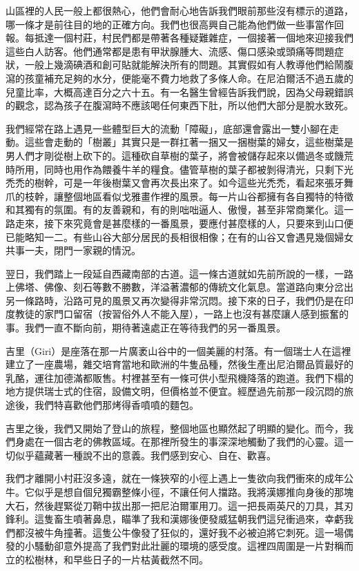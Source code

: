 山區裡的人民一般上都很熱心，他們會耐心地告訴我們眼前那些沒有標示的道路，哪一條才是前往目的地的正確方向。我們也很高興自己能為他們做一些事當作回報。每抵達一個村莊，村民們都是帶著各種疑難雜症，一個接著一個地來迎接我們這些白人訪客。他們通常都是患有甲狀腺腫大、流感、傷口感染或頭痛等問題症狀，一般上幾滴碘酒和創可貼就能解決所有的問題。其實假如有人教導他們給鬧腹瀉的孩童補充足夠的水分，便能毫不費力地救了多條人命。在尼泊爾活不過五歲的兒童比率，大概高達百分之六十五。有一名醫生曾經告訴我們說，因為父母親錯誤的觀念，認為孩子在腹瀉時不應該喝任何東西下肚，所以他們大部分是脫水致死。

我們經常在路上遇見一些體型巨大的流動「障礙」，底部還會露出一雙小腳在走動。這些會走動的「樹叢」其實只是一群扛著一捆又一捆樹葉的婦女，這些樹葉是男人們才剛從樹上砍下的。這種砍自草樹的葉子，將會被儲存起來以備過冬或饑荒時所用，同時也用作為餵養牛羊的糧食。儘管草樹的葉子都被剝得清光，只剩下光禿禿的樹幹，可是一年後樹葉又會再次長出來了。如今這些光禿禿，看起來張牙舞爪的枝幹，讓整個地區看似戈雅畫作裡的風景。每一片山谷都擁有各自獨特的特徵和其獨有的氛圍。有的友善親和，有的則咄咄逼人、傲慢，甚至非常商業化。這一路走來，接下來究竟會是甚麼樣的一番風景，要應付甚麼樣的人，只要來到山口便已能略知一二。有些山谷大部分居民的長相很相像；在有的山谷又會遇見幾個婦女共事一夫，閉門一家親的情況。

翌日，我們踏上一段延自西藏南部的古道。這一條古道就如先前所說的一樣，一路上佛塔、佛像、刻石等數不勝數，洋溢著濃郁的傳統文化氣息。當道路向東分岔出另一條路時，沿路可見的風景又再次變得非常沉悶。接下來的日子，我們仍是在印度教徒的家門口留宿（按習俗外人不能入屋），一路上也沒有甚麼讓人感到振奮的事。我們一直不斷向前，期待著遠處正在等待我們的另一番風景。

吉里（Giri）是座落在那一片廣袤山谷中的一個美麗的村落。有一個瑞士人在這裡建立了一座農場，雜交培育當地和歐洲的牛隻品種，然後生產出尼泊爾品質最好的乳酪，運往加德滿都販售。村裡甚至有一條可供小型飛機降落的跑道。我們下榻的地方提供瑞士式的住宿，設備文明，但價格並不便宜。經歷過先前那一段沉悶的旅途後，我們特喜歡他們那烤得香噴噴的麵包。

吉里之後，我們又開始了登山的旅程，整個地區也顯然起了明顯的變化。而今，我們身處在一個古老的佛教區域。在那裡所發生的事深深地觸動了我們的心靈。這一切似乎蘊藏著一種說不出的意義。我們感到安心、自在、歡喜。

我們才離開小村莊沒多遠，就在一條狹窄的小徑上遇上一隻欲向我們衝來的成年公牛。它似乎是想自個兒獨霸整條小徑，不讓任何人擋路。我將漢娜推向身後的那塊大石，然後趕緊從刀鞘中拔出那一把尼泊爾軍用刀。這一把長兩英尺的刀具，其刃鋒利。這隻畜生噴著鼻息，瞄準了我和漢娜後便發威猛朝我們這兒衝過來，幸虧我們都沒被牛角撞著。這隻公牛像發了狂似的，還好我不必被迫將它刺死。這一場偶發的小騷動卻意外提高了我們對此壯麗的環境的感受度。這裡四周圍是一片對稱而立的松樹林，和早些日子的一片枯黃截然不同。

